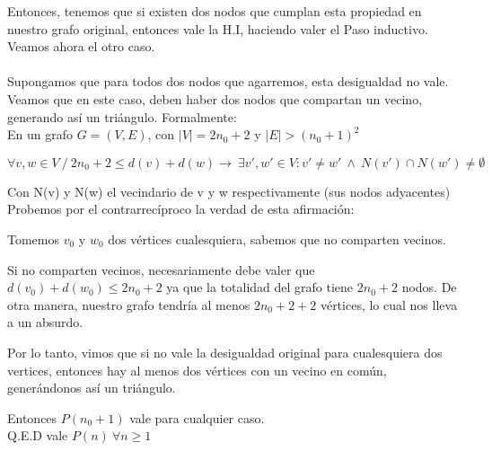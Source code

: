 \documentclass{article}
\begin{document}
Entonces, tenemos que si existen dos nodos que cumplan esta propiedad en nuestro grafo original, entonces vale la H.I, haciendo valer el Paso inductivo.
Veamos ahora el otro caso.\\ \\
Supongamos que para todos dos nodos que agarremos, esta desigualdad no vale. Veamos que en este caso, deben haber dos nodos que compartan un vecino, generando así un triángulo. Formalmente:\\

En un grafo \( G = (V,E) \), con \( |V| = 2n_0 + 2 \) y \( |E| > (n_0 + 1)^2 \)

\[
 \forall v,w \in V \ / \ 2n_0 + 2 \leq d(v) + d(w)  \rightarrow  \ \exists v',w' \in V :   v' \neq  w' \ \land \  N(v') \cap N(w') \neq \emptyset
\]

Con N(v) y N(w) el vecindario de v y w respectivamente (sus nodos adyacentes)\\
Probemos por el contrarrecíproco la verdad de esta afirmación:

Tomemos \( v_0 \) y \( w_0 \) dos vértices cualesquiera, sabemos que no comparten vecinos.

Si no comparten vecinos, necesariamente debe valer que \( d(v_0) + d(w_0) \leq 2n_0 + 2 \) ya que la totalidad del grafo tiene \( 2n_0 + 2 \) nodos. De otra manera, nuestro grafo tendría al menos \( 2n_0 + 2 + 2 \) vértices, lo cual nos lleva a un absurdo.

Por lo tanto, vimos que si no vale la desigualdad original para cualesquiera dos vertices, entonces hay al menos dos vértices con un vecino en común, generándonos así un triángulo. 

Entonces \( P(n_0 + 1) \) vale para cualquier caso.\\

Q.E.D vale \( P(n) \ \forall n \geq 1 \)
\end{document}
